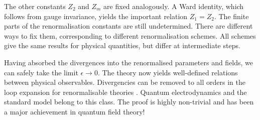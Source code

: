 \documentclass[12pt]{report}
\newcommand{\2}{\ensuremath{\sqrt{2}\,}}
\begin{document}
{      The other constants $Z_2$ and $Z_m$ are fixed analogously.
      A Ward identity, which follows from gauge invariance, yields the important
      relation  $Z_1=Z_2$. 
      The finite parts of the renormalisation constants are still undetermined. There are different 
      ways to fix them, corresponding to different renormalisation 
      schemes. All schemes
      give the same results for physical quantities, but differ at intermediate steps.

      Having absorbed the divergences into the renormalised parameters and fields, we can safely take
      the limit $\epsilon\to 0$. The theory now yields well-defined relations between physical
      observables. Divergencies can be removed to all orders in the loop expansion for renormalisable
      theories \cite{peskin,thooft}. Quantum electrodynamics and the standard model belong to this
      class. The proof is highly non-trivial and has been a major achievement in quantum field theory!

      
}
\end{document}
